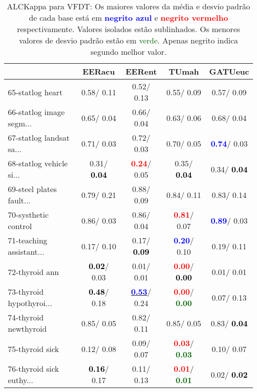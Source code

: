 \begin{table}[h]
\caption{ALCKappa para VFDT: Os maiores valores da média e desvio padrão de cada base está em \textcolor{blue}{\textbf{negrito azul}} e \textcolor{red}{\textbf{negrito vermelho}} respectivamente. Valores isolados estão sublinhados. Os menores valores de desvio padrão estão em \textcolor{darkgreen}{verde}. Apenas negrito indica segundo melhor valor.}
\begin{center}\begin{tabular}{lc|c|c|c}
 & EERacu & EERent & TUmah & \textbf{GATUeuc}\\ \hline 65-statlog heart &   0.58/  0.11 &   0.52/  0.13 &   0.55/  0.09 &   0.57/  0.09 \\
66-statlog image segm... &   0.65/  0.04 &   0.66/  0.04 &   0.63/  0.06 &   0.68/  0.04 \\
67-statlog landsat sa... &   0.71/  0.03 &   0.72/  0.03 &   0.70/  0.05 & \textcolor{blue}{\textbf{  0.74}}/  0.03 \\
68-statlog vehicle si... &   0.31/\textcolor{black}{\textbf{  0.04}} & \textcolor{red}{\textbf{  0.24}}/  0.05 &   0.35/\textcolor{black}{\textbf{  0.04}} &   0.34/\textcolor{black}{\textbf{  0.04}} \\
69-steel plates fault... &   0.79/  0.21 &   0.88/  0.09 &   0.84/  0.11 &   0.83/  0.14 \\
70-systhetic control &   0.86/  0.03 &   0.86/  0.04 & \textcolor{red}{\textbf{  0.81}}/  0.07 & \textcolor{blue}{\textbf{  0.89}}/  0.03 \\
71-teaching assistant... &   0.17/  0.10 &   0.17/\textcolor{black}{\textbf{  0.09}} & \textcolor{blue}{\textbf{  0.20}}/  0.10 &   0.19/  0.11 \\ \hline
72-thyroid ann & \textcolor{black}{\textbf{  0.02}}/  0.03 &   0.01/  0.01 & \textcolor{red}{\textbf{  0.00}}/\textcolor{black}{\textbf{  0.00}} &   0.01/  0.01 \\
73-thyroid hypothyroi... & \textcolor{black}{\textbf{  0.48}}/  0.18 & \underline{\textcolor{blue}{\textbf{  0.53}}}/  0.24 & \textcolor{red}{\textbf{  0.00}}/\textcolor{darkgreen}{\textbf{  0.00}} &   0.07/  0.13 \\
74-thyroid newthyroid &   0.85/  0.05 &   0.82/  0.11 &   0.85/  0.05 &   0.83/\textcolor{black}{\textbf{  0.04}} \\
75-thyroid sick &   0.12/  0.08 &   0.09/  0.07 & \textcolor{red}{\textbf{  0.03}}/\textcolor{darkgreen}{\textbf{  0.03}} &   0.10/  0.07 \\
76-thyroid sick euthy... & \textcolor{black}{\textbf{  0.16}}/  0.17 &   0.11/  0.13 & \textcolor{red}{\textbf{  0.01}}/\textcolor{darkgreen}{\textbf{  0.01}} &   0.02/\textcolor{black}{\textbf{  0.02}} \\

\end{tabular}
\end{center}
\end{table}
